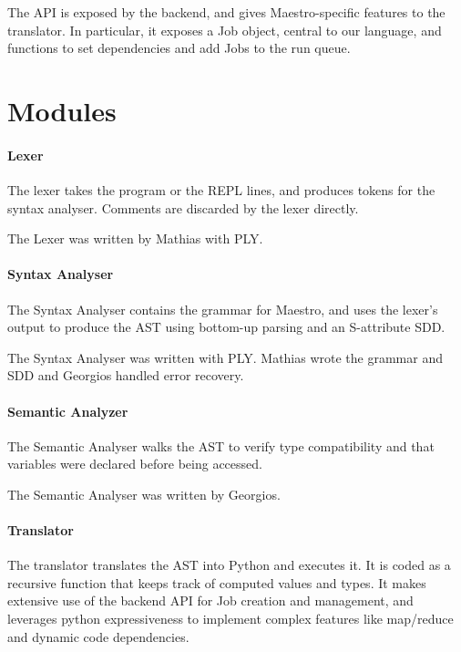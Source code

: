 The API is exposed by the backend, and gives Maestro-specific features to the translator.
In particular, it exposes a Job object, central to our language, and functions to set dependencies and add Jobs
to the run queue.

\section{Modules}

\paragraph{Lexer}

The lexer takes the program or the REPL lines, and produces tokens for the syntax analyser.
Comments are discarded by the lexer directly.

The Lexer was written by Mathias with PLY.

\paragraph{Syntax Analyser}

The Syntax Analyser contains the grammar for Maestro, and uses the lexer's output to produce the AST using bottom-up parsing and an S-attribute SDD.

The Syntax Analyser was written with PLY. Mathias wrote the grammar and SDD and Georgios handled error recovery.

\paragraph{Semantic Analyzer}

The Semantic Analyser walks the AST to verify type compatibility and that variables were declared before being accessed.

The Semantic Analyser was written by Georgios.

\paragraph{Translator}

The translator translates the AST into Python and executes it.
It is coded as a recursive function that keeps track of computed values and types.
It makes extensive use of the backend API for Job creation and management, and leverages python expressiveness to implement complex features like map/reduce and dynamic code dependencies.

